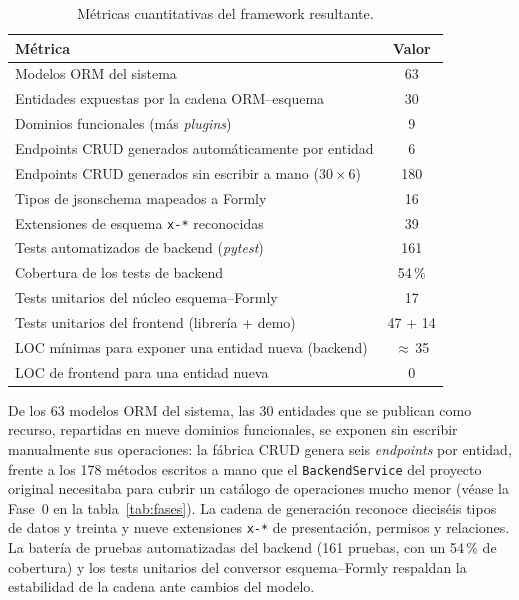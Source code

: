 \begin{table}[!htbp]
\caption{Métricas cuantitativas del framework resultante.}
\label{tab:metricas}
\centering
\begin{tabular}{|p{9.5cm}|c|}
\hline
\textbf{Métrica} & \textbf{Valor} \\ \hline
Modelos ORM del sistema & 63 \\ \hline
Entidades expuestas por la cadena ORM--esquema & 30 \\ \hline
Dominios funcionales (más \emph{plugins}) & 9 \\ \hline
Endpoints CRUD generados automáticamente por entidad & 6 \\ \hline
Endpoints CRUD generados sin escribir a mano ($30\times6$) & 180 \\ \hline
Tipos de \gls{jsonschema} mapeados a Formly & 16 \\ \hline
Extensiones de esquema \texttt{x-*} reconocidas & 39 \\ \hline
Tests automatizados de backend (\emph{pytest}) & 161 \\ \hline
Cobertura de los tests de backend & 54\,\% \\ \hline
Tests unitarios del núcleo esquema--Formly & 17 \\ \hline
Tests unitarios del frontend (librería + demo) & 47 + 14 \\ \hline
LOC mínimas para exponer una entidad nueva (backend) & $\approx$\,35 \\ \hline
LOC de frontend para una entidad nueva & 0 \\ \hline
\end{tabular}
\end{table}

De los 63 modelos ORM del sistema, las 30 entidades que se publican como
recurso, repartidas en nueve dominios funcionales, se exponen sin
escribir manualmente sus operaciones: la fábrica CRUD genera seis \emph{endpoints}
por entidad, frente a los 178 métodos escritos a mano que el
\texttt{Backend\allowbreak Service} del proyecto original necesitaba para
cubrir un catálogo de operaciones mucho menor (véase la Fase~0 en la
tabla~\ref{tab:fases}). La cadena de generación reconoce
dieciséis tipos de datos y treinta y nueve extensiones \texttt{x-*} de
presentación, permisos y relaciones. La batería de pruebas automatizadas del
backend (161 pruebas, con un 54\,\% de cobertura) y los tests unitarios del
conversor esquema--Formly respaldan la estabilidad de la cadena ante cambios
del modelo.

